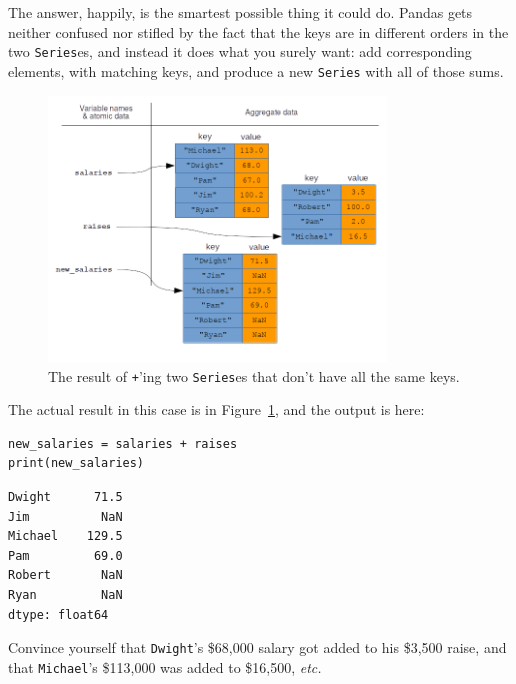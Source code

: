The answer, happily, is the smartest possible thing it could do. Pandas gets
neither confused nor stifled by the fact that the keys are in different orders
in the two \texttt{Series}es, and instead it does what you surely want:
add corresponding elements, with matching keys, and produce a new
\texttt{Series} with all of those sums.

\begin{figure}[ht]
\centering
\includegraphics[width=0.8\textwidth]{vectorizedPandas2.png}
\caption{The result of \texttt{+}'ing two \texttt{Series}es that don't have all the same keys.}
\label{fig:vectorizedPandas2}
\end{figure}

The actual result in this case is in Figure~\ref{fig:vectorizedPandas2}, and
the output is here:


\begin{Verbatim}[fontsize=\small,samepage=true,frame=single,framesep=3mm]
new_salaries = salaries + raises
print(new_salaries)
\end{Verbatim}

\begin{Verbatim}[fontsize=\small,samepage=true,frame=leftline,framesep=5mm,framerule=1mm]
Dwight      71.5
Jim          NaN
Michael    129.5
Pam         69.0
Robert       NaN
Ryan         NaN
dtype: float64
\end{Verbatim}


Convince yourself that \texttt{Dwight}'s \$68,000 salary got added to his
\$3,500 raise, and that \texttt{Michael}'s \$113,000 was added to \$16,500,
\textit{etc.}

